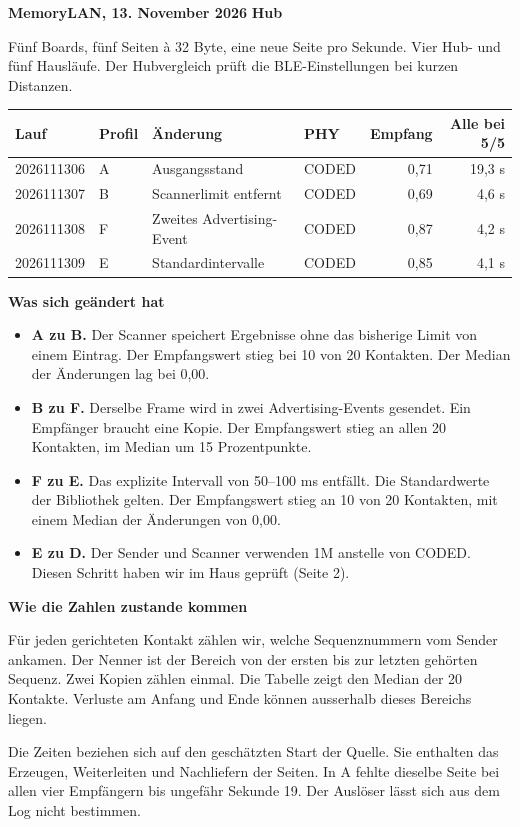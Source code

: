 \documentclass[a4paper,11pt]{article}
\begin{document}
\textbf{MemoryLAN, 13. November 2026} \hfill \textbf{Hub}

Fünf Boards, fünf Seiten à 32 Byte, eine neue Seite pro Sekunde. Vier Hub- und fünf Hausläufe. Der Hubvergleich prüft die BLE-Einstellungen bei kurzen Distanzen.

\begin{center}
\small
\begin{tabular}{llllrr}\toprule
Lauf & Profil & Änderung & PHY & Empfang & Alle bei 5/5 \\ \midrule
2026111306 & A & Ausgangsstand & CODED & 0,71 & 19,3 s \\
2026111307 & B & Scannerlimit entfernt & CODED & 0,69 & 4,6 s \\
2026111308 & F & Zweites Advertising-Event & CODED & 0,87 & 4,2 s \\
2026111309 & E & Standardintervalle & CODED & 0,85 & 4,1 s \\
\bottomrule
\end{tabular}
\end{center}

\textbf{Was sich geändert hat}
\begin{itemize}
\item \textbf{A zu B.} Der Scanner speichert Ergebnisse ohne das bisherige Limit von einem Eintrag. Der Empfangswert stieg bei 10 von 20 Kontakten. Der Median der Änderungen lag bei 0,00.
\item \textbf{B zu F.} Derselbe Frame wird in zwei Advertising-Events gesendet. Ein Empfänger braucht eine Kopie. Der Empfangswert stieg an allen 20 Kontakten, im Median um 15 Prozentpunkte.
\item \textbf{F zu E.} Das explizite Intervall von 50--100 ms entfällt. Die Standardwerte der Bibliothek gelten. Der Empfangswert stieg an 10 von 20 Kontakten, mit einem Median der Änderungen von 0,00.
\item \textbf{E zu D.} Der Sender und Scanner verwenden 1M anstelle von CODED. Diesen Schritt haben wir im Haus geprüft (Seite 2).
\end{itemize}

\textbf{Wie die Zahlen zustande kommen}

Für jeden gerichteten Kontakt zählen wir, welche Sequenznummern vom Sender ankamen. Der Nenner ist der Bereich von der ersten bis zur letzten gehörten Sequenz. Zwei Kopien zählen einmal. Die Tabelle zeigt den Median der 20 Kontakte. Verluste am Anfang und Ende können ausserhalb dieses Bereichs liegen.

Die Zeiten beziehen sich auf den geschätzten Start der Quelle. Sie enthalten das Erzeugen, Weiterleiten und Nachliefern der Seiten. In A fehlte dieselbe Seite bei allen vier Empfängern bis ungefähr Sekunde 19. Der Auslöser lässt sich aus dem Log nicht bestimmen.
\end{document}

